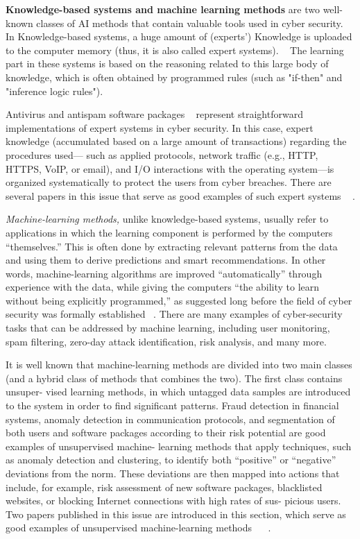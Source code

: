\textbf{Knowledge-based systems and machine learning methods} are two well-known classes of AI methods that contain valuable tools
used in cyber security. In Knowledge-based systems, a huge amount of (experts') Knowledge is uploaded to the computer memory (thus, it is also called expert systems). ~\cite{Felgenbaum:1977:AAI:1622943.1623042}
The learning part in these systems is based on the reasoning related to this large body of knowledge, which is often obtained  by programmed rules (such as "if-then" and "inference logic rules").

Antivirus and antispam software packages ~\cite{Blanzieri:2008:SLT:1612711.1612715} represent straightforward
implementations of expert systems in cyber security. In this case, expert knowledge
(accumulated based on a large amount of transactions) regarding the procedures used—
such as applied protocols, network traffic (e.g., HTTP, HTTPS, VoIP, or email), and I/O
interactions with the operating system—is organized systematically to protect the
users from cyber breaches. There are several papers in this issue that serve as good
examples of such expert systems ~\cite{Maltinsky:2017:NNM:3055535.3040966} .


\textit{Machine-learning methods,} unlike knowledge-based systems, usually refer to applications in which the learning component is performed by the computers “themselves.”
This is often done by extracting relevant patterns from the data and using them to
derive predictions and smart recommendations. In other words, machine-learning algorithms are improved “automatically” through experience with the data, while giving
the computers “the ability to learn without being explicitly programmed,” as suggested
long before the field of cyber security was formally established ~\cite{Samuel:1959:SML:1661923.1661924}. There
are many examples of cyber-security tasks that can be addressed by machine learning,
including user monitoring, spam filtering, zero-day attack identification, risk analysis,
and many more.

It is well known that machine-learning methods are divided into two main classes
(and a hybrid class of methods that combines the two). The first class contains unsuper-
vised learning methods, in which untagged data samples are introduced to the system
in order to find significant patterns. Fraud detection in financial systems, anomaly
detection in communication protocols, and segmentation of both users and software
packages according to their risk potential are good examples of unsupervised machine-
learning methods that apply techniques, such as anomaly detection and clustering, to
identify both “positive” or “negative” deviations from the norm. These deviations are
then mapped into actions that include, for example, risk assessment of new software
packages, blacklisted websites, or blocking Internet connections with high rates of sus-
picious users. Two papers published in this issue are introduced in this section, which
serve as good examples of unsupervised machine-learning methods ~\cite{Maltinsky:2017:NNM:3055535.3040966}
~\cite{Harel:2017:CSR:3055535.3057729}.

